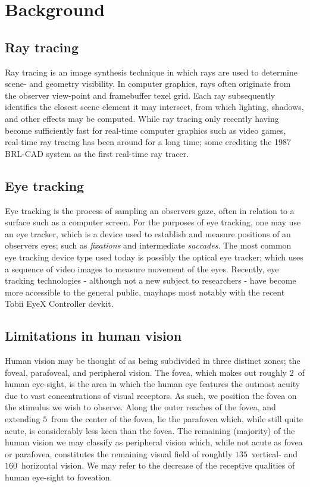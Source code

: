 \section{Background}
\subsection{Ray tracing}
Ray tracing is an image synthesis technique in which rays are used to determine scene- and geometry visibility.
In computer graphics, rays often originate from the observer view-point and framebuffer texel grid.
Each ray subsequently identifies the closest scene element it may intersect, from which lighting, shadows, and other effects may be computed.
While ray tracing only recently having become sufficiently fast for real-time computer graphics such as video games, real-time ray tracing has been around for a long time; some crediting the 1987 BRL-CAD system as the first real-time ray tracer\cite{stay87}.

\subsection{Eye tracking}
Eye tracking is the process of sampling an observers gaze, often in relation to a surface such as a computer screen.
For the purposes of eye tracking, one may use an eye tracker, which is a device used to establish and measure positions of an observers eyes\cite{duchowski07}; such as \textit{fixations} and intermediate \textit{saccades}\cite{rayner98}.
The most common eye tracking device type used today is possibly the optical eye tracker; which uses a sequence of video images to measure movement of the eyes\cite{duchowski07}.
Recently, eye tracking technologies - although not a new subject to researchers - have become more accessible to the general public, mayhaps most notably with the recent Tobii EyeX Controller devkit.

\subsection{Limitations in human vision}
Human vision may be thought of as being subdivided in three distinct zones; the foveal, parafoveal, and peripheral vision\cite{rayner98}.
The fovea, which makes out roughly $2$\degree\ of human eye-sight, is the area in which the human eye features the outmost acuity due to vast concentrations of visual receptors.
As such, we position the fovea on the stimulus we wish to observe.
Along the outer reaches of the fovea, and extending $5$\degree\ from the center of the fovea, lie the parafovea which, while still quite acute, is considerably less keen than the fovea.
The remaining (majority) of the human vision we may classify as peripheral vision which, while not acute as fovea or parafovea, constitutes the remaining visual field of roughtly $135$\degree\ vertical- and $160$\degree\ horizontal vision\cite{guenter12}.
We may refer to the decrease of the receptive qualities of human eye-sight to foveation.

